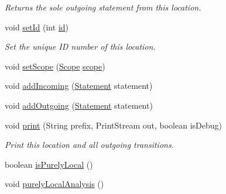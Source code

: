 \begin{DoxyCompactItemize}
\begin{DoxyCompactList}\small\item\em Returns the sole outgoing statement from this location. \end{DoxyCompactList}\item 
void \hyperlink{interfaceedu_1_1udel_1_1cis_1_1vsl_1_1civl_1_1model_1_1IF_1_1location_1_1Location_adbbb8b37b9621511c87dcea07f3bebd3}{set\+Id} (int \hyperlink{interfaceedu_1_1udel_1_1cis_1_1vsl_1_1civl_1_1model_1_1IF_1_1location_1_1Location_aa087c36f8f37141028bfaf182ee3859b}{id})
\begin{DoxyCompactList}\small\item\em Set the unique I\+D number of this location. \end{DoxyCompactList}\item 
void \hyperlink{interfaceedu_1_1udel_1_1cis_1_1vsl_1_1civl_1_1model_1_1IF_1_1location_1_1Location_a69c1eaa336fbde67f17b816d9ad30989}{set\+Scope} (\hyperlink{interfaceedu_1_1udel_1_1cis_1_1vsl_1_1civl_1_1model_1_1IF_1_1Scope}{Scope} \hyperlink{interfaceedu_1_1udel_1_1cis_1_1vsl_1_1civl_1_1model_1_1IF_1_1location_1_1Location_acca7f0ca8077f826b1f7c60bf5d7af31}{scope})
\item 
void \hyperlink{interfaceedu_1_1udel_1_1cis_1_1vsl_1_1civl_1_1model_1_1IF_1_1location_1_1Location_a87cd359f75b3d67ea62d1c9064f573ff}{add\+Incoming} (\hyperlink{interfaceedu_1_1udel_1_1cis_1_1vsl_1_1civl_1_1model_1_1IF_1_1statement_1_1Statement}{Statement} statement)
\item 
void \hyperlink{interfaceedu_1_1udel_1_1cis_1_1vsl_1_1civl_1_1model_1_1IF_1_1location_1_1Location_a2af2802b2bde82c7652339dd68f71462}{add\+Outgoing} (\hyperlink{interfaceedu_1_1udel_1_1cis_1_1vsl_1_1civl_1_1model_1_1IF_1_1statement_1_1Statement}{Statement} statement)
\item 
void \hyperlink{interfaceedu_1_1udel_1_1cis_1_1vsl_1_1civl_1_1model_1_1IF_1_1location_1_1Location_a9191c775fffac3f82929164eb80ed118}{print} (String prefix, Print\+Stream out, boolean is\+Debug)
\begin{DoxyCompactList}\small\item\em Print this location and all outgoing transitions. \end{DoxyCompactList}\item 
boolean \hyperlink{interfaceedu_1_1udel_1_1cis_1_1vsl_1_1civl_1_1model_1_1IF_1_1location_1_1Location_afc86b39bb8432f74ea31021b056123fe}{is\+Purely\+Local} ()
\item 
\hypertarget{interfaceedu_1_1udel_1_1cis_1_1vsl_1_1civl_1_1model_1_1IF_1_1location_1_1Location_a00be64a01c2b8ae04a9718efccdfea20}{}void \hyperlink{interfaceedu_1_1udel_1_1cis_1_1vsl_1_1civl_1_1model_1_1IF_1_1location_1_1Location_a00be64a01c2b8ae04a9718efccdfea20}{purely\+Local\+Analysis} ()\label{interfaceedu_1_1udel_1_1cis_1_1vsl_1_1civl_1_1model_1_1IF_1_1location_1_1Location_a00be64a01c2b8ae04a9718efccdfea20}


\end{DoxyCompactItemize}
